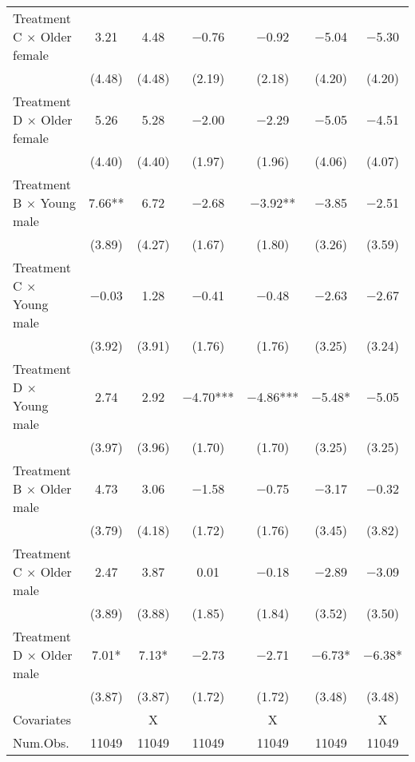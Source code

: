 \documentclass[12pt, a4paper]{article}
\begin{document}
\begin{table}[H]
\begin{threeparttable}
\begin{tabular}[t]{lcccccc}
Treatment C $\times$ Older female & \num{3.21} & \num{4.48} & \num{-0.76} & \num{-0.92} & \num{-5.04} & \num{-5.30}\\
 & (\num{4.48}) & (\num{4.48}) & (\num{2.19}) & (\num{2.18}) & (\num{4.20}) & (\num{4.20})\\
Treatment D $\times$ Older female & \num{5.26} & \num{5.28} & \num{-2.00} & \num{-2.29} & \num{-5.05} & \num{-4.51}\\
 & (\num{4.40}) & (\num{4.40}) & (\num{1.97}) & (\num{1.96}) & (\num{4.06}) & (\num{4.07})\\
Treatment B $\times$ Young male & \num{7.66}** & \num{6.72} & \num{-2.68} & \num{-3.92}** & \num{-3.85} & \num{-2.51}\\
 & (\num{3.89}) & (\num{4.27}) & (\num{1.67}) & (\num{1.80}) & (\num{3.26}) & (\num{3.59})\\
Treatment C $\times$ Young male & \num{-0.03} & \num{1.28} & \num{-0.41} & \num{-0.48} & \num{-2.63} & \num{-2.67}\\
 & (\num{3.92}) & (\num{3.91}) & (\num{1.76}) & (\num{1.76}) & (\num{3.25}) & (\num{3.24})\\
Treatment D $\times$ Young male & \num{2.74} & \num{2.92} & \num{-4.70}*** & \num{-4.86}*** & \num{-5.48}* & \num{-5.05}\\
 & (\num{3.97}) & (\num{3.96}) & (\num{1.70}) & (\num{1.70}) & (\num{3.25}) & (\num{3.25})\\
Treatment B $\times$ Older male & \num{4.73} & \num{3.06} & \num{-1.58} & \num{-0.75} & \num{-3.17} & \num{-0.32}\\
 & (\num{3.79}) & (\num{4.18}) & (\num{1.72}) & (\num{1.76}) & (\num{3.45}) & (\num{3.82})\\
Treatment C $\times$ Older male & \num{2.47} & \num{3.87} & \num{0.01} & \num{-0.18} & \num{-2.89} & \num{-3.09}\\
 & (\num{3.89}) & (\num{3.88}) & (\num{1.85}) & (\num{1.84}) & (\num{3.52}) & (\num{3.50})\\
Treatment D $\times$ Older male & \num{7.01}* & \num{7.13}* & \num{-2.73} & \num{-2.71} & \num{-6.73}* & \num{-6.38}*\\
 & (\num{3.87}) & (\num{3.87}) & (\num{1.72}) & (\num{1.72}) & (\num{3.48}) & (\num{3.48})\\
\midrule
Covariates &  & X &  & X &  & X\\
Num.Obs. & \num{11049} & \num{11049} & \num{11049} & \num{11049} & \num{11049} & \num{11049}\\
\bottomrule
\end{tabular}

\end{threeparttable}
\end{table}
\end{document}
